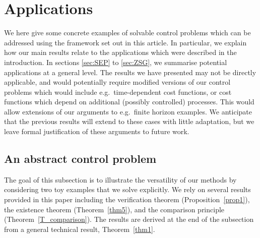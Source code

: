 \documentclass{article}
\theoremstyle{definition}
\numberwithin{equation}{section}
\numberwithin{theorem}{section}
\begin{document}
\section{Applications}
\label{sec:applications}

We here give some concrete examples of solvable control problems which can be addressed using the framework set out in this article. In particular, we explain how our main results relate to the applications which were described in the introduction. In sections \ref{sec:SEP} to \ref{sec:ZSG}, we summarise potential applications at a general level. The results we have presented may not be directly applicable, and would potentially require modified versions of our control problems which would include e.g.~time-dependent cost functions, or cost functions which depend on additional (possibly controlled) processes. This would allow extensions of our arguments to e.g.~finite horizon examples. We anticipate that the previous results will extend to these cases with little adaptation, but we leave formal justification of these arguments to future work.



    \subsection{An abstract control problem}
The goal of this subsection is to illustrate the versatility of our methods by considering two toy examples that we solve explicitly. We rely on several results provided in this paper including the verification theorem (Proposition~\ref{prop1}), the existence theorem (Theorem~\ref{thm5}), and the comparison principle (Theorem~\ref{T_comparison}). The results are derived at the end of the subsection from a general technical result, Theorem~\ref{thm1}.
\end{document}
